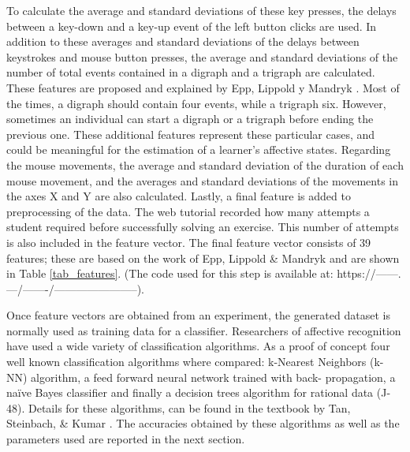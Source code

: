 \documentclass[a4paper]{llncs}
\begin{document}
To calculate the average and standard deviations of these key presses, the delays
between a key-down and a key-up event of the left button clicks are used. In
addition to these averages and standard deviations of the delays between
keystrokes and mouse button presses, the average and standard deviations of the
number of total events contained in a digraph and a trigraph are calculated.
These features are proposed and explained by Epp, Lippold y Mandryk \cite{epp2011identifying}. Most
of the times, a digraph should contain four events, while a trigraph six.
However, sometimes an individual can start a digraph or a trigraph before ending
the previous one. These additional features represent these particular cases,
and could be meaningful for the estimation of a learner's affective states.
Regarding the mouse movements, the average and standard deviation of the
duration of each mouse movement, and the averages and standard deviations of the
movements in the axes X and Y are also calculated. Lastly, a final feature is
added to preprocessing of the data. The web tutorial recorded how many attempts
a student required before successfully solving an exercise. This number of
attempts is also included in the feature vector. The final feature vector
consists of 39 features; these are based on the work of Epp, Lippold \& Mandryk
\cite{epp2011identifying} and are shown in Table \ref{tab_features}. (The code used for this step is available at:
https://------.---/-------/-----------------------). %

Once feature vectors are obtained from an experiment, the generated dataset is
normally used as training data for a classifier. Researchers of affective
recognition have used a wide variety of classification algorithms. As a proof of
concept four well known classification algorithms where compared: k-Nearest
Neighbors (k-NN) algorithm, a feed forward neural network trained with back-
propagation, a na\"ive Bayes classifier and finally a decision trees algorithm for
rational data (J-48). Details for these algorithms, can be found in the textbook
by Tan, Steinbach, \& Kumar \cite{tan2006introduction}. The accuracies obtained by these algorithms
as well as the parameters used are reported in the next section.
\end{document}
